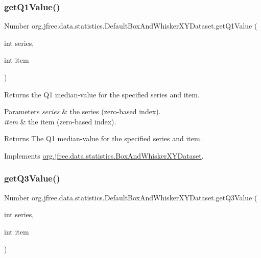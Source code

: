 \subsubsection{\texorpdfstring{get\+Q1\+Value()}{getQ1Value()}}
{\footnotesize\ttfamily Number org.\+jfree.\+data.\+statistics.\+Default\+Box\+And\+Whisker\+X\+Y\+Dataset.\+get\+Q1\+Value (\begin{DoxyParamCaption}\item[{int}]{series,  }\item[{int}]{item }\end{DoxyParamCaption})}

Returns the Q1 median-\/value for the specified series and item.


\begin{DoxyParams}{Parameters}
{\em series} & the series (zero-\/based index). \\
\hline
{\em item} & the item (zero-\/based index).\\
\hline
\end{DoxyParams}
\begin{DoxyReturn}{Returns}
The Q1 median-\/value for the specified series and item. 
\end{DoxyReturn}


Implements \mbox{\hyperlink{interfaceorg_1_1jfree_1_1data_1_1statistics_1_1_box_and_whisker_x_y_dataset_a9594fa74639e0dde5c4464db4de1e65a}{org.\+jfree.\+data.\+statistics.\+Box\+And\+Whisker\+X\+Y\+Dataset}}.

\mbox{\label{classorg_1_1jfree_1_1data_1_1statistics_1_1_default_box_and_whisker_x_y_dataset_a02e36cd7245601a5bb665c36f953a27a}} 
\subsubsection{\texorpdfstring{get\+Q3\+Value()}{getQ3Value()}}
{\footnotesize\ttfamily Number org.\+jfree.\+data.\+statistics.\+Default\+Box\+And\+Whisker\+X\+Y\+Dataset.\+get\+Q3\+Value (\begin{DoxyParamCaption}\item[{int}]{series,  }\item[{int}]{item }\end{DoxyParamCaption})}

